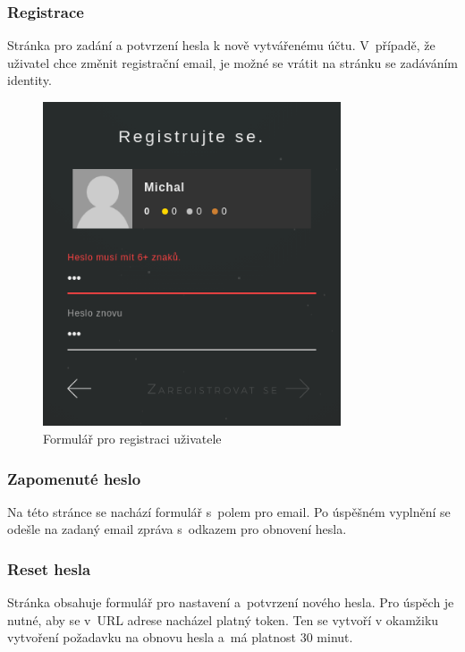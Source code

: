 \documentclass[a4paper,12pt]{article}
\begin{document}
\subsubsection{Registrace}

Stránka pro zadání a potvrzení hesla k nově vytvářenému účtu. V~případě, že uživatel chce změnit registrační email, je možné se vrátit na stránku se zadáváním identity.

\begin{figure}[H]
\begin{center}
\includegraphics[width=250pt]{Images/SignUp.png}
\caption{Formulář pro registraci uživatele}
\label{SignUp}
\end{center}
\end{figure}

\subsubsection{Zapomenuté heslo}

Na této stránce se nachází formulář s~polem pro email. Po úspěšném vyplnění se odešle na zadaný email zpráva s~odkazem pro obnovení hesla.

\subsubsection{Reset hesla}

Stránka obsahuje formulář pro nastavení a~potvrzení nového hesla. Pro úspěch je nutné, aby se v~URL adrese nacházel platný token. Ten se vytvoří v okamžiku vytvoření požadavku na obnovu hesla a~má platnost 30 minut.
\end{document}
